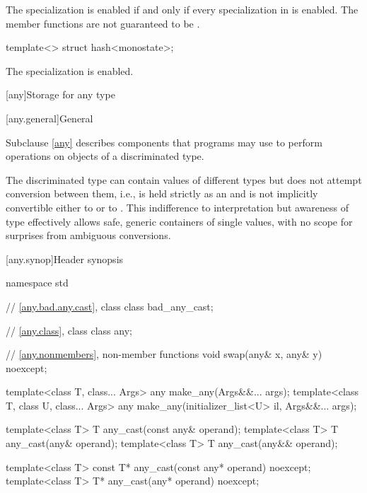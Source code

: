 \begin{itemdescr}
\pnum
The specialization  is enabled
if and only if every specialization in  is enabled.
The member functions are not guaranteed to be .
\end{itemdescr}

%
\begin{itemdecl}
template<> struct hash<monostate>;
\end{itemdecl}

\begin{itemdescr}
\pnum
The specialization is enabled.
\end{itemdescr}


[any]{Storage for any type}

[any.general]{General}

\pnum
Subclause \ref{any} describes components that \Cpp{} programs may use to perform operations on objects of a discriminated type.

\pnum
\begin{note}
The discriminated type can contain values of different types but does not attempt conversion between them,
i.e.,  is held strictly as an  and is not implicitly convertible either to  or to .
This indifference to interpretation but awareness of type effectively allows safe, generic containers of single values, with no scope for surprises from ambiguous conversions.
\end{note}

[any.synop]{Header  synopsis}

%

\begin{codeblock}
namespace std {
  // \ref{any.bad.any.cast}, class 
  class bad_any_cast;

  // \ref{any.class}, class 
  class any;

  // \ref{any.nonmembers}, non-member functions
  void swap(any& x, any& y) noexcept;

  template<class T, class... Args>
    any make_any(Args&&... args);
  template<class T, class U, class... Args>
    any make_any(initializer_list<U> il, Args&&... args);

  template<class T>
    T any_cast(const any& operand);
  template<class T>
    T any_cast(any& operand);
  template<class T>
    T any_cast(any&& operand);

  template<class T>
    const T* any_cast(const any* operand) noexcept;
  template<class T>
    T* any_cast(any* operand) noexcept;
}
\end{codeblock}

